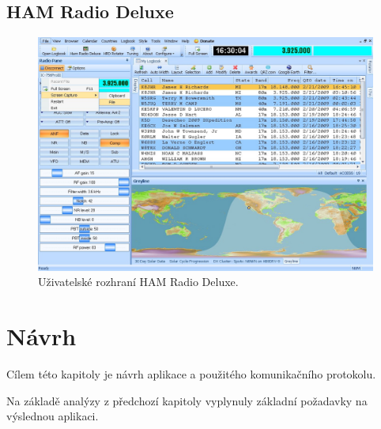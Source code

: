 \section{HAM Radio Deluxe}

\begin{figure}[h]
\centering
\includegraphics[trim=0cm 0cm 0cm 0cm, scale=0.33]{fig/hrd}
\caption{Uživatelské rozhraní HAM Radio Deluxe.}
\label{fig:FigureExample}
\end{figure}

\chapter{Návrh}
\label{navrh}

Cílem této kapitoly je návrh aplikace a použitého komunikačního protokolu.

Na základě analýzy z předchozí kapitoly vyplynuly základní požadavky
na výslednou aplikaci.

